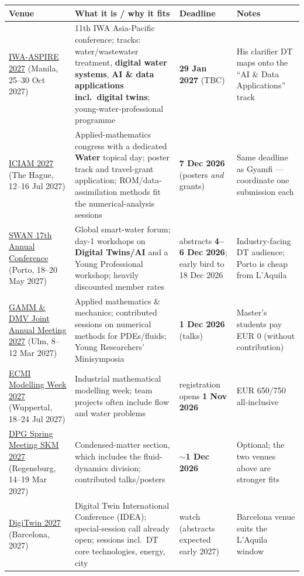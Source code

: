 \documentclass[11pt,a4paper]{article}
\begin{document}
\begin{longtable}{@{}p{3.3cm}p{5.6cm}p{2.2cm}p{2.8cm}@{}}
\toprule
\textbf{Venue} & \textbf{What it is / why it fits} & \textbf{Deadline} & \textbf{Notes} \\
\midrule
\endhead
\href{https://www.iwaaspire2027.org/blank-4}{IWA-ASPIRE 2027} (Manila, 25--30 Oct 2027) & 11th IWA Asia-Pacific conference; tracks: water/wastewater treatment, \textbf{digital water systems}, \textbf{AI \& data applications incl.\ digital twins}; young-water-professional programme & \textbf{29 Jan 2027} (TBC) & His clarifier DT maps onto the ``AI \& Data Applications'' track \\
\midrule
\href{https://iciam2027.org/}{ICIAM 2027} (The Hague, 12--16 Jul 2027) & Applied-mathematics congress with a dedicated \textbf{Water} topical day; poster track and travel-grant application; ROM/data-assimilation methods fit the numerical-analysis sessions & \textbf{7 Dec 2026} (posters \emph{and} grants) & Same deadline as Gyamfi --- coordinate one submission each \\
\midrule
\href{https://swan-forum.com/events/swan-2027}{SWAN 17th Annual Conference} (Porto, 18--20 May 2027) & Global smart-water forum; day-1 workshops on \textbf{Digital Twins/AI} and a Young Professional workshop; heavily discounted member rates & abstracts \textbf{4--6 Dec 2026}; early bird to 18 Dec 2026 & Industry-facing DT audience; Porto is cheap from L'Aquila \\
\midrule
\href{https://jahrestagung.gamm.org/joint-annual-meeting-2027/}{GAMM \& DMV Joint Annual Meeting 2027} (Ulm, 8--12 Mar 2027) & Applied mathematics \& mechanics; contributed sessions on numerical methods for PDEs/fluids; Young Researchers' Minisymposia & \textbf{1 Dec 2026} (talks) & Master's students pay EUR 0 (without contribution) \\
\midrule
\href{https://ecmimw.uni-wuppertal.de/en}{ECMI Modelling Week 2027} (Wuppertal, 18--24 Jul 2027) & Industrial mathematical modelling week; team projects often include flow and water problems & registration opens \textbf{1 Nov 2026} & EUR 650/750 all-inclusive \\
\midrule
\href{https://www.dpg-physik.de/aktivitaeten-und-programme/tagungen/fruehjahrstagungen/2027}{DPG Spring Meeting SKM 2027} (Regensburg, 14--19 Mar 2027) & Condensed-matter section, which includes the fluid-dynamics division; contributed talks/posters & $\sim$\textbf{1 Dec 2026} & Optional; the two venues above are stronger fits \\
\midrule
\href{https://idea-global.net/Listofevents/info.aspx?itemid=828}{DigiTwin 2027} (Barcelona, 2027) & Digital Twin International Conference (IDEA); special-session call already open; sessions incl.\ DT core technologies, energy, city & watch (abstracts expected early 2027) & Barcelona venue suits the L'Aquila window \\
\bottomrule
\end{longtable}
\end{document}
